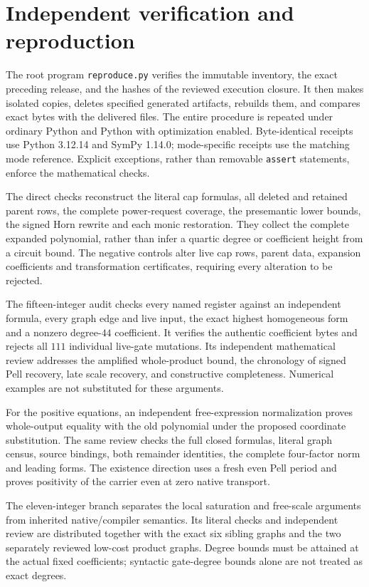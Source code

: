 \section{Independent verification and reproduction}
The root program \texttt{reproduce.py} verifies the immutable inventory,
the exact preceding release, and the hashes of the reviewed execution
closure. It then makes isolated copies, deletes specified generated
artifacts, rebuilds them, and compares exact bytes with the delivered files.
The entire procedure is repeated under ordinary Python and Python with
optimization enabled. Byte-identical receipts use Python 3.12.14 and
SymPy 1.14.0; mode-specific receipts use the matching mode reference. Explicit exceptions, rather than removable
\texttt{assert} statements, enforce the mathematical checks.

The direct checks reconstruct the literal cap formulas, all deleted and
retained parent rows, the complete power-request coverage, the presemantic
lower bounds, the signed Horn rewrite and each monic restoration. They
collect the complete expanded polynomial, rather than infer a quartic
degree or coefficient height from a circuit bound. The negative controls
alter live cap rows, parent data, expansion coefficients and transformation
certificates, requiring every alteration to be rejected.

The fifteen-integer audit checks every named register against an independent
formula, every graph edge and live input, the exact highest homogeneous form
and a nonzero degree-$44$ coefficient. It verifies the authentic coefficient
bytes and rejects all $111$ individual live-gate mutations. Its independent
mathematical review addresses the amplified whole-product bound, the
chronology of signed Pell recovery, late scale recovery, and constructive
completeness. Numerical examples are not substituted for these arguments.

For the positive equations, an independent free-expression normalization
proves whole-output equality with the old polynomial under the proposed
coordinate substitution. The same review checks the full closed formulas,
literal graph census, source bindings, both remainder identities, the complete
four-factor norm and leading forms. The existence direction uses a fresh even
Pell period and proves positivity of the carrier even at zero native transport.

The eleven-integer branch separates the local saturation and free-scale
arguments from inherited native/compiler semantics. Its literal checks and
independent review are distributed together with the exact six sibling
graphs and the two separately reviewed low-cost product graphs. Degree bounds must be attained at the actual fixed coefficients;
syntactic gate-degree bounds alone are not treated as exact degrees.


